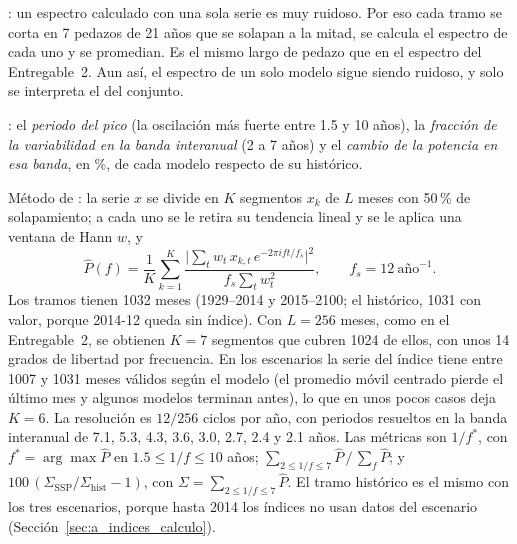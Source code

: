 \documentclass[11pt,a4paper]{article}
\begin{document}
: un espectro calculado con una sola serie es muy ruidoso.
Por eso cada tramo se corta en 7 pedazos de 21 años que se solapan a la mitad, se calcula el espectro de cada uno y se promedian.
Es el mismo largo de pedazo que en el espectro del Entregable~2.
Aun así, el espectro de un solo modelo sigue siendo ruidoso, y solo se interpreta el del conjunto.

: el \emph{periodo del pico} (la oscilación más fuerte entre 1.5 y 10 años), la \emph{fracción de la variabilidad en la banda interanual} (2 a 7 años) y el \emph{cambio de la potencia en esa banda}, en \%, de cada modelo respecto de su histórico.

Método de \citet{welch1967}: la serie $x$ se divide en $K$ segmentos $x_k$ de $L$ meses con 50\,\% de solapamiento; a cada uno se le retira su tendencia lineal y se le aplica una ventana de Hann $w$, y
\begin{equation}
\label{eq:welch}
\hat P(f) = \frac{1}{K}\sum_{k=1}^{K} \frac{\big|\sum_{t} w_t\,x_{k,t}\,e^{-2\pi i f t/f_s}\big|^2}{f_s \sum_t w_t^2}, \qquad f_s = 12~\text{año}^{-1}.
\end{equation}
Los tramos tienen 1032 meses (1929--2014 y 2015--2100; el histórico, 1031 con valor, porque 2014-12 queda sin índice).
Con $L = 256$ meses, como en el Entregable~2, se obtienen $K = 7$ segmentos que cubren 1024 de ellos, con unos 14 grados de libertad por frecuencia.
En los escenarios la serie del índice tiene entre 1007 y 1031 meses válidos según el modelo (el promedio móvil centrado pierde el último mes y algunos modelos terminan antes), lo que en unos pocos casos deja $K = 6$.
La resolución es $12/256$ ciclos por año, con periodos resueltos en la banda interanual de 7.1, 5.3, 4.3, 3.6, 3.0, 2.7, 2.4 y 2.1 años.
Las métricas son $1/f^{*}$, con $f^{*} = \arg\max \hat P$ en $1.5 \le 1/f \le 10$ años; $\sum_{2 \le 1/f \le 7} \hat P \,/\, \sum_f \hat P$; y $100\,(\Sigma_{\mathrm{SSP}}/\Sigma_{\mathrm{hist}} - 1)$, con $\Sigma = \sum_{2 \le 1/f \le 7} \hat P$.
El tramo histórico es el mismo con los tres escenarios, porque hasta 2014 los índices no usan datos del escenario (Sección~\ref{sec:a_indices_calculo}).
\end{document}
